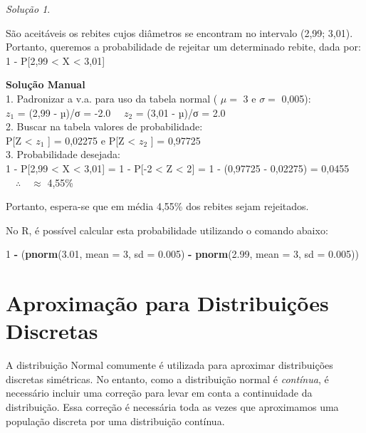 \documentclass[
]{book}
\newenvironment{Shaded}{\begin{snugshade}}{\end{snugshade}}
\newcommand{\DataTypeTok}[1]{\textcolor[rgb]{0.13,0.29,0.53}{#1}}
\newcommand{\DecValTok}[1]{\textcolor[rgb]{0.00,0.00,0.81}{#1}}
\newcommand{\FloatTok}[1]{\textcolor[rgb]{0.00,0.00,0.81}{#1}}
\newcommand{\KeywordTok}[1]{\textcolor[rgb]{0.13,0.29,0.53}{\textbf{#1}}}
\newcommand{\NormalTok}[1]{#1}
\newcommand{\OperatorTok}[1]{\textcolor[rgb]{0.81,0.36,0.00}{\textbf{#1}}}
\newcommand{\StringTok}[1]{\textcolor[rgb]{0.31,0.60,0.02}{#1}}
\theoremstyle{definition}
\theoremstyle{definition}
\theoremstyle{definition}
\theoremstyle{remark}
\newtheorem*{solution}{Solução}
\begin{document}
\begin{solution}
{}
\end{solution}

São aceitáveis os rebites cujos diâmetros se encontram no intervalo (2,99; 3,01).\\
Portanto, queremos a probabilidade de rejeitar um determinado rebite, dada por:\\
1 - P{[}2,99 \textless{} X \textless{} 3,01{]}

\textbf{Solução Manual}\\
1. Padronizar a v.a. para uso da tabela normal ( \(\mu=\) 3 e \(\sigma =\) 0,005):\\
\(z_1\) = (2,99 - µ)/σ = -2.0 \(\quad z_2\) = (3,01 - µ)/σ = 2.0\\
2. Buscar na tabela valores de probabilidade:\\
P{[}Z \textless{} \(z_1\) {]} = 0,02275 e P{[}Z \textless{} \(z_2\) {]} = 0,97725\\
3. Probabilidade desejada:\\
1 - P{[}2,99 \textless{} X \textless{} 3,01{]} = 1 - P{[}-2 \textless{} Z \textless{} 2{]} = 1 - (0,97725 - 0,02275) = 0,0455 \(\quad \therefore \quad \approx\) 4,55\%

Portanto, espera-se que em média 4,55\% dos rebites sejam rejeitados.

No R, é possível calcular esta probabilidade utilizando o comando abaixo:

\begin{Shaded}
\begin{Highlighting}[]
\DecValTok{1} \OperatorTok{-}\StringTok{ }\NormalTok{(}\KeywordTok{pnorm}\NormalTok{(}\FloatTok{3.01}\NormalTok{, }\DataTypeTok{mean =} \DecValTok{3}\NormalTok{, }\DataTypeTok{sd =} \FloatTok{0.005}\NormalTok{) }\OperatorTok{-}\StringTok{ }\KeywordTok{pnorm}\NormalTok{(}\FloatTok{2.99}\NormalTok{, }\DataTypeTok{mean =} \DecValTok{3}\NormalTok{, }\DataTypeTok{sd =} \FloatTok{0.005}\NormalTok{))}
\end{Highlighting}
\end{Shaded}

\hypertarget{aproximauxe7uxe3o-para-distribuiuxe7uxf5es-discretas}{%
\section{Aproximação para Distribuições Discretas}\label{aproximauxe7uxe3o-para-distribuiuxe7uxf5es-discretas}}

A distribuição Normal comumente é utilizada para aproximar distribuições discretas simétricas. No entanto, como a distribuição normal é \emph{contínua}, é necessário incluir uma correção para levar em conta a continuidade da distribuição. Essa correção é necessária toda as vezes que aproximamos uma população discreta por uma distribuição contínua.
\end{document}
